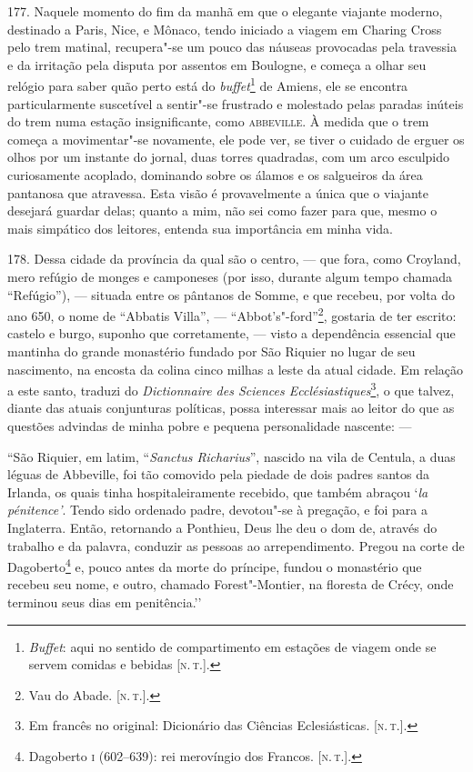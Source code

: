 177. Naquele momento do fim da manhã em que o elegante viajante moderno,
destinado a Paris, Nice, e Mônaco, tendo iniciado a viagem em Charing
Cross pelo trem matinal, recupera"-se um pouco das náuseas provocadas
pela travessia e da irritação pela disputa por assentos em Boulogne, e
começa a olhar seu relógio para saber quão perto está do
\emph{buffet}\footnote{\emph{Buffet}: aqui no sentido de compartimento
  em estações de viagem onde se servem comidas e bebidas {[}\textsc{n.\,t.}{]}.}
de Amiens, ele se encontra particularmente suscetível a sentir"-se
frustrado e molestado pelas paradas inúteis do trem numa estação
insignificante, como \textsc{abbeville}. À medida que o trem começa a
movimentar"-se novamente, ele pode ver, se tiver o cuidado de erguer os
olhos por um instante do jornal, duas torres quadradas, com um arco
esculpido curiosamente acoplado, dominando sobre os álamos e os
salgueiros da área pantanosa que atravessa. Esta visão é provavelmente a
única que o viajante desejará guardar delas; quanto a mim, não sei como
fazer para que, mesmo o mais simpático dos leitores, entenda sua
importância em minha vida.

178. Dessa cidade da província da qual são o centro, --- que fora, como
Croyland, mero refúgio de monges e camponeses (por isso, durante algum
tempo chamada ``Refúgio''), --- situada entre os pântanos de Somme, e que
recebeu, por volta do ano 650, o nome de ``Abbatis Villa'', ---
``Abbot's"-ford''\footnote{Vau do Abade. {[}\textsc{n.\,t.}{]}.}, gostaria de
ter escrito: castelo e burgo, suponho que corretamente, --- visto a
dependência essencial que mantinha do grande monastério fundado por São
Riquier no lugar de seu nascimento, na encosta da colina cinco milhas a
leste da atual cidade. Em relação a este santo, traduzi do
\emph{Dictionnaire des Sciences Ecclésiastiques}\footnote{Em francês no
  original: Dicionário das Ciências Eclesiásticas. {[}\textsc{n.\,t.}{]}.}, o
que talvez, diante das atuais conjunturas políticas, possa interessar
mais ao leitor do que as questões advindas de minha pobre e pequena
personalidade nascente: ---

``São Riquier, em latim, ``\emph{Sanctus Richarius}'', nascido na vila
de Centula, a duas léguas de Abbeville, foi tão comovido pela piedade de
dois padres santos da Irlanda, os quais tinha hospitaleiramente
recebido, que também abraçou `\emph{la pénitence'}. Tendo sido ordenado
padre, devotou"-se à pregação, e foi para a Inglaterra. Então, retornando
a Ponthieu, Deus lhe deu o dom de, através do trabalho e da palavra,
conduzir as pessoas ao arrependimento. Pregou na corte de
Dagoberto\footnote{Dagoberto \textsc{i} (602--639): rei merovíngio dos Francos.
  {[}\textsc{n.\,t.}{]}.} e, pouco antes da morte do príncipe, fundou o
monastério que recebeu seu nome, e outro, chamado Forest"-Montier, na
floresta de Crécy, onde terminou seus dias em penitência.''

